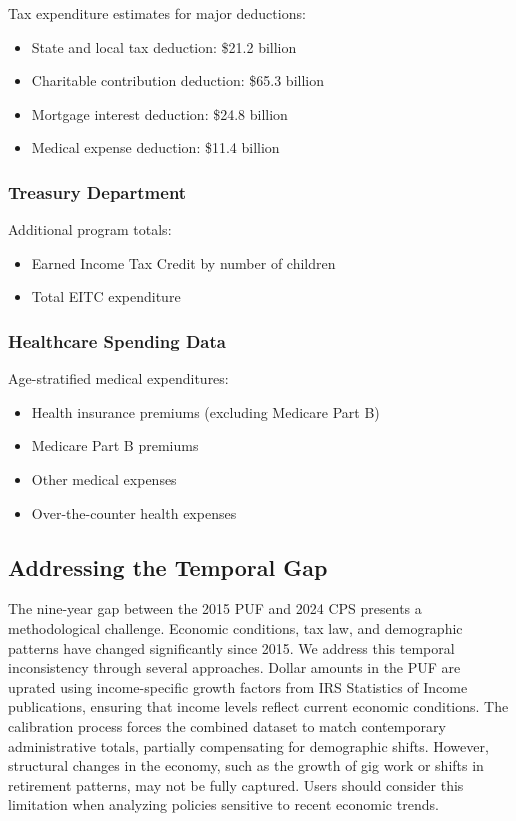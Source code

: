 Tax expenditure estimates for major deductions:
\begin{itemize}
\item State and local tax deduction: \$21.2 billion
\item Charitable contribution deduction: \$65.3 billion
\item Mortgage interest deduction: \$24.8 billion
\item Medical expense deduction: \$11.4 billion
\end{itemize}

\subsubsection{Treasury Department}

Additional program totals:
\begin{itemize}
\item Earned Income Tax Credit by number of children
\item Total EITC expenditure
\end{itemize}

\subsubsection{Healthcare Spending Data}

Age-stratified medical expenditures:
\begin{itemize}
\item Health insurance premiums (excluding Medicare Part B)
\item Medicare Part B premiums
\item Other medical expenses
\item Over-the-counter health expenses
\end{itemize}

\subsection{Addressing the Temporal Gap}

The nine-year gap between the 2015 PUF and 2024 CPS presents a methodological challenge. Economic conditions, tax law, and demographic patterns have changed significantly since 2015. We address this temporal inconsistency through several approaches. Dollar amounts in the PUF are uprated using income-specific growth factors from IRS Statistics of Income publications, ensuring that income levels reflect current economic conditions. The calibration process forces the combined dataset to match contemporary administrative totals, partially compensating for demographic shifts. However, structural changes in the economy, such as the growth of gig work or shifts in retirement patterns, may not be fully captured. Users should consider this limitation when analyzing policies sensitive to recent economic trends.


